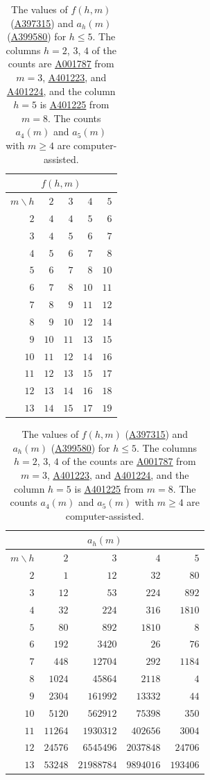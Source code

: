 \documentclass[12pt]{article}
\theoremstyle{plain}
\theoremstyle{definition}
\theoremstyle{remark}
\newcommand{\seqnum}[1]{\href{https://oeis.org/#1}{\rm \underline{#1}}}
\begin{document}
\begin{table}[!htb]
\centering\footnotesize\setlength{\tabcolsep}{4pt}
\begin{tabular}{@{}r|rrrr@{}}
\multicolumn{5}{c}{$f(h,m)$}\\
\toprule
$m\backslash h$ & $2$ & $3$ & $4$ & $5$\\
\midrule
$2$ & $4$ & $4$ & $5$ & $6$\\
$3$ & $4$ & $5$ & $6$ & $7$\\
$4$ & $5$ & $6$ & $7$ & $8$\\
$5$ & $6$ & $7$ & $8$ & $10$\\
$6$ & $7$ & $8$ & $10$ & $11$\\
$7$ & $8$ & $9$ & $11$ & $12$\\
$8$ & $9$ & $10$ & $12$ & $14$\\
$9$ & $10$ & $11$ & $13$ & $15$\\
$10$ & $11$ & $12$ & $14$ & $16$\\
$11$ & $12$ & $13$ & $15$ & $17$\\
$12$ & $13$ & $14$ & $16$ & $18$\\
$13$ & $14$ & $15$ & $17$ & $19$\\
\bottomrule
\end{tabular}\hspace{1.2em}
\begin{tabular}{@{}r|rrrr@{}}
\multicolumn{5}{c}{$a_h(m)$}\\
\toprule
$m\backslash h$ & $2$ & $3$ & $4$ & $5$\\
\midrule
$2$ & $1$ & $12$ & $32$ & $80$\\
$3$ & $12$ & $53$ & $224$ & $892$\\
$4$ & $32$ & $224$ & $316$ & $1810$\\
$5$ & $80$ & $892$ & $1810$ & $8$\\
$6$ & $192$ & $3420$ & $26$ & $76$\\
$7$ & $448$ & $12704$ & $292$ & $1184$\\
$8$ & $1024$ & $45864$ & $2118$ & $4$\\
$9$ & $2304$ & $161992$ & $13332$ & $44$\\
$10$ & $5120$ & $562912$ & $75398$ & $350$\\
$11$ & $11264$ & $1930312$ & $402656$ & $3004$\\
$12$ & $24576$ & $6545496$ & $2037848$ & $24706$\\
$13$ & $53248$ & $21988784$ & $9894016$ & $193406$\\
\bottomrule
\end{tabular}
\caption{The values of $f(h,m)$ (\seqnum{A397315}) and $a_h(m)$
(\seqnum{A399580}) for $h\le5$. The columns $h=2$, $3$, $4$ of the counts are
\seqnum{A001787} from $m=3$, \seqnum{A401223}, and \seqnum{A401224}, and the
column $h=5$ is \seqnum{A401225} from $m=8$. The counts $a_4(m)$ and $a_5(m)$ with
$m\ge4$ are computer-assisted.}
\label{tab:values}
\end{table}
\end{document}
